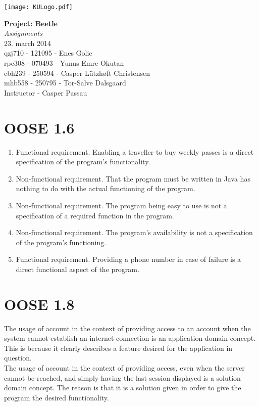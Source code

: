 \documentclass[12pt,a4paper]{article}
\begin{document}
	
	\begin{minipage}[b]{1.0\linewidth} 
		\texttt{[image: KULogo.pdf]}
		
		\vspace*{-16ex}
		\vspace {35ex}
		\begin{center}
			{\huge \bf Project: Beetle} \\
			{\huge\textit {Assignments}}\vspace*{4ex} \\
			{\large 23. march 2014}\\
			\vspace*{2ex}
			qzj710 - 121095 - Enes Golic \\
			rpc308 - 070493 - Yunus Emre Okutan \\
			cbh239 - 250594 - Casper Lützhøft Christensen \\
			mhb558 - 250795 - Tor-Salve Dalsgaard\\
			\vspace*{1ex}
			Instructor - Casper Passau
			
		\end{center}
	\end{minipage}
	
\newpage

\section{OOSE 1.6}
\begin{enumerate}
\item Functional requirement. Enabling a traveller to buy weekly passes is a direct specification of the program’s functionality.
\item Non-functional requirement. That the program must be written in Java has nothing to do with the actual functioning of the program.
\item Non-functional requirement. The program being easy to use is not a specification of a required function in the program.
\item Non-functional requirement. The program’s availability is not a specification of the program’s functioning.
\item Functional requirement. Providing a phone number in case of failure is a direct functional aspect of the program.	
\end{enumerate}

\section{OOSE 1.8}
The usage of account in the context of providing access to an account when the system cannot establish an internet-connection is an application domain concept. This is because it clearly describes a feature desired for the application in question.\\
The usage of account in the context of providing access, even when the server cannot be reached, and simply having the last session displayed is a solution domain concept. The reason is that it is a solution given in order to give the program the desired functionality.
\end{document}
